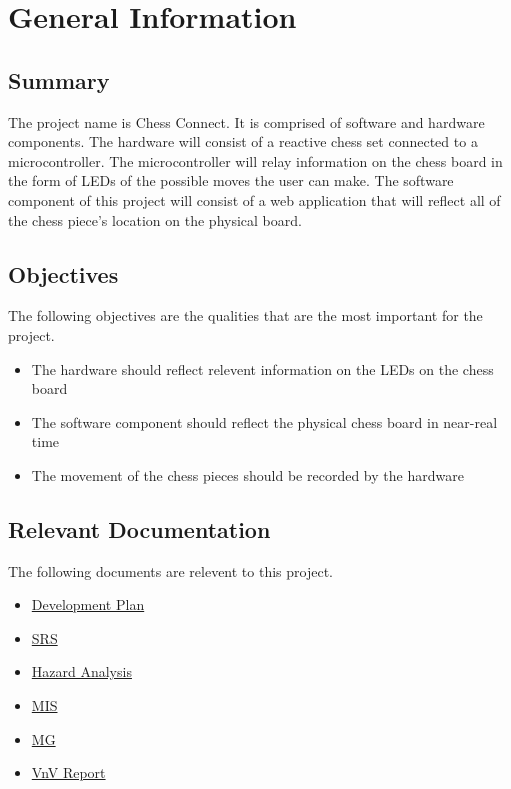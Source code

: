 \documentclass[12pt, titlepage]{article}
\begin{document}

\newpage


\section{General Information}

\subsection{Summary}
The project name is Chess Connect. It is comprised of software and hardware components. The hardware will consist of a reactive chess set 
connected to a microcontroller. The microcontroller will relay information on the chess board in the form of LEDs of the possible moves the user can make.
The software component of this project will consist of a web application that will reflect all of the chess piece's location on the physical board.

\subsection{Objectives}
The following objectives are the qualities that are the most important for the project.
\begin{itemize}
  \item The hardware should reflect relevent information on the LEDs on the chess board
  \item The software component should reflect the physical chess board in near-real time
  \item The movement of the chess pieces should be recorded by the hardware
\end{itemize}

\subsection{Relevant Documentation}
The following documents are relevent to this project.
\begin{itemize}
  \item \href{file:../DevelopmentPlan/DevelopmentPlan.pdf}{Development Plan}
  \item \href{file:../SRS/SRS.pdf}{SRS}
  \item \href{file:../HazardAnalysis/HazardAnalysis.pdf}{Hazard Analysis}
  \item \href{file:../Design/SoftDetailedDes/MIS.pdf}{MIS}
  \item \href{file:../Design/SoftArchitecture/MG.pdf}{MG}
  \item \href{file:../VnVReport/VnVReport.pdf}{VnV Report}
\end{itemize}
\end{document}
